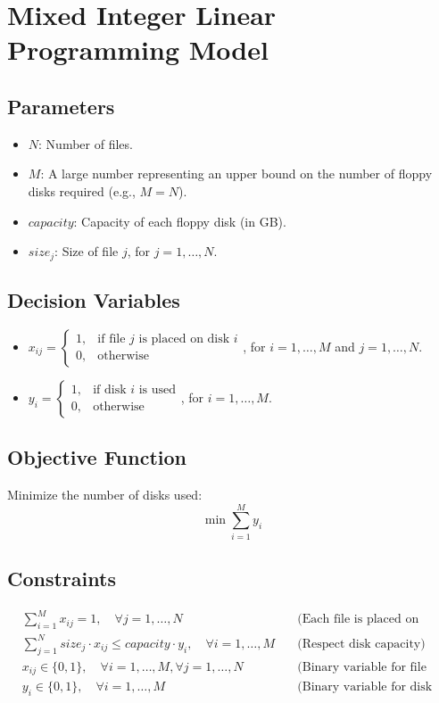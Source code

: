 \documentclass{article}
\begin{document}
\section*{Mixed Integer Linear Programming Model}

\subsection*{Parameters}
\begin{itemize}
    \item $N$: Number of files.
    \item $M$: A large number representing an upper bound on the number of floppy disks required (e.g., $M = N$).
    \item $capacity$: Capacity of each floppy disk (in GB).
    \item $size_j$: Size of file $j$, for $j = 1, \ldots, N$.
\end{itemize}

\subsection*{Decision Variables}
\begin{itemize}
    \item $x_{ij} = 
    \begin{cases} 
    1, & \text{if file } j \text{ is placed on disk } i \\ 
    0, & \text{otherwise} 
    \end{cases}$, for $i = 1, \ldots, M$ and $j = 1, \ldots, N$.
    \item $y_i = 
    \begin{cases} 
    1, & \text{if disk } i \text{ is used} \\ 
    0, & \text{otherwise} 
    \end{cases}$, for $i = 1, \ldots, M$.
\end{itemize}

\subsection*{Objective Function}
Minimize the number of disks used:
\[
\min \sum_{i=1}^{M} y_i
\]

\subsection*{Constraints}
\begin{align}
    &\sum_{i=1}^{M} x_{ij} = 1, \quad \forall j = 1, \ldots, N \quad &\text{(Each file is placed on exactly one disk)} \\
    &\sum_{j=1}^{N} size_j \cdot x_{ij} \leq capacity \cdot y_i, \quad \forall i = 1, \ldots, M \quad &\text{(Respect disk capacity)} \\
    &x_{ij} \in \{0, 1\}, \quad \forall i = 1, \ldots, M, \forall j = 1, \ldots, N \quad &\text{(Binary variable for file placement)} \\
    &y_i \in \{0, 1\}, \quad \forall i = 1, \ldots, M \quad &\text{(Binary variable for disk usage)}
\end{align}
\end{document}
